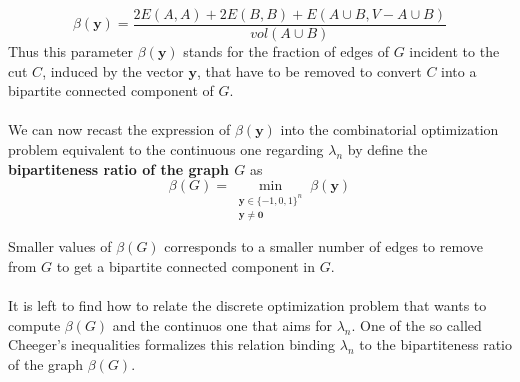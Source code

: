 \[ \beta(\mathbf{y}) = \frac{2E(A,A) + 2E(B,B) + E(A \cup B, V - A \cup B)}{vol(A \cup B)} \]
Thus this parameter $ \beta(\mathbf{y}) $ stands for the fraction of edges of $ G $ incident to the cut $ C $, induced by the vector $ \mathbf{y} $, that have to be removed to convert $ C $ into a bipartite connected component of $ G $.
\\ \\
We can now recast the expression of $ \beta(\mathbf{y}) $ into the combinatorial optimization problem equivalent to the continuous one regarding $ \lambda_n $ by define the \textbf{bipartiteness ratio of the graph $ G $} as
\[ \beta(G) = \min_{\substack{\mathbf{y} \in \{-1,0,1\}^n \\ \mathbf{y} \ne \mathbf{0}}} \beta(\mathbf{y}) \]

Smaller values of $ \beta(G) $ corresponds to a smaller number of edges to remove from $ G $ to get a bipartite connected component in $ G $. 
\\
\\
It is left to find how to relate the discrete optimization problem that wants to compute $ \beta(G) $ and the continuos one that aims for $ \lambda_n $.
One of the so called Cheeger's inequalities formalizes this relation binding $ \lambda_n $ to the bipartiteness ratio of the graph $ \beta(G) $.

